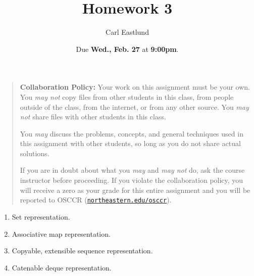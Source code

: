 \documentclass{article}
\title{Homework 3}
\author{Carl Eastlund}
\date{Due \textbf{Wed., Feb. 27} at \textbf{9:00pm}.}
\begin{document}
\maketitle

\newcommand\link[2][http://]{\href{#1#2}{\nolinkurl{#2}}}
\newcommand\http[1]{\link[http://]{#1}}
\newcommand\https[1]{\link[https://]{#1}}
\newcommand\email[1]{\link[mailto:]{#1}}

\begin{quotation}

  \noindent \textbf{Collaboration Policy:} Your work on this assignment must be
  your own.  You \emph{may not} copy files from other students in this class,
  from people outside of the class, from the internet, or from any other source.
  You \emph{may not} share files with other students in this class.

  \medskip

  \noindent You \emph{may} discuss the problems, concepts, and general
  techniques used in this assignment with other students, so long as you do not
  share actual solutions.

  \medskip

  \noindent If you are in doubt about what you \emph{may} and \emph{may not} do,
  ask the course instructor before proceeding.  If you violate the collaboration
  policy, you will receive a zero as your grade for this entire assignment and
  you will be reported to OSCCR (\link{northeastern.edu/osccr}).

\end{quotation}

\bigskip

\begin{enumerate}

\item Set representation.

\item Associative map representation.

\item Copyable, extensible sequence representation.

\item Catenable deque representation.

\end{enumerate}
\end{document}
